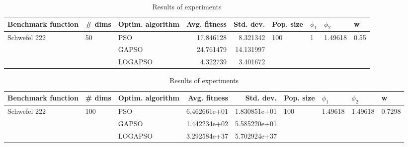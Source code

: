 \documentclass{article}
\begin{document}
\begin{table}
\centering
\caption{Results of experiments}
\begin{tabular}{lllrrllll}
\toprule
           Benchmark function &             \# dims & Optim. algorithm &  Avg. fitness &  Std. dev. &            Pop. size &         $\phi_{1}$ &               $\phi_{2}$ &                     w \\
\midrule
\multirow{3}{*}{Schwefel 222} & \multirow{3}{*}{50} &              PSO &     17.846128 &   8.321342 & \multirow{3}{*}{100} & \multirow{3}{*}{1} & \multirow{3}{*}{1.49618} & \multirow{3}{*}{0.55} \\
                              &                     &            GAPSO &     24.761479 &  14.131997 &                      &                    &                          &                       \\
                              &                     &          LOGAPSO &      4.322739 &   3.401672 &                      &                    &                          &                       \\
\bottomrule
\end{tabular}
\end{table}
\begin{table}
\centering
\caption{Results of experiments}
\begin{tabular}{lllrrllll}
\toprule
           Benchmark function &              \# dims & Optim. algorithm &  Avg. fitness &    Std. dev. &            Pop. size &               $\phi_{1}$ &               $\phi_{2}$ &                       w \\
\midrule
\multirow{3}{*}{Schwefel 222} & \multirow{3}{*}{100} &              PSO &  6.462661e+01 & 1.830851e+01 & \multirow{3}{*}{100} & \multirow{3}{*}{1.49618} & \multirow{3}{*}{1.49618} & \multirow{3}{*}{0.7298} \\
                              &                      &            GAPSO &  1.442234e+02 & 5.585220e+01 &                      &                          &                          &                         \\
                              &                      &          LOGAPSO &  3.292584e+37 & 5.702924e+37 &                      &                          &                          &                         \\
\bottomrule
\end{tabular}
\end{table}
\end{document}
